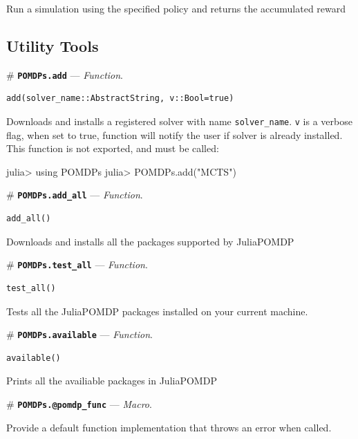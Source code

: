 \documentclass[12pt,]{article}
\newenvironment{Shaded}{}{}
\newcommand{\StringTok}[1]{\textcolor[rgb]{0.25,0.44,0.63}{{#1}}}
\newcommand{\NormalTok}[1]{{#1}}
\begin{document}
Run a simulation using the specified policy and returns the accumulated
reward

\subsection{Utility Tools}\label{utility-tools}

\# \textbf{\texttt{POMDPs.add}} --- \emph{Function}.

\begin{verbatim}
add(solver_name::AbstractString, v::Bool=true)
\end{verbatim}

Downloads and installs a registered solver with name
\texttt{solver\_name}. \texttt{v} is a verbose flag, when set to true,
function will notify the user if solver is already installed. This
function is not exported, and must be called:

\begin{Shaded}
\begin{Highlighting}[]
\NormalTok{julia> using POMDPs}
\NormalTok{julia> POMDPs.add(}\StringTok{"MCTS"}\NormalTok{)}
\end{Highlighting}
\end{Shaded}

\# \textbf{\texttt{POMDPs.add\_all}} --- \emph{Function}.

\begin{verbatim}
add_all()
\end{verbatim}

Downloads and installs all the packages supported by JuliaPOMDP

\# \textbf{\texttt{POMDPs.test\_all}} --- \emph{Function}.

\begin{verbatim}
test_all()
\end{verbatim}

Tests all the JuliaPOMDP packages installed on your current machine.

\# \textbf{\texttt{POMDPs.available}} --- \emph{Function}.

\begin{verbatim}
available()
\end{verbatim}

Prints all the availiable packages in JuliaPOMDP

\# \textbf{\texttt{POMDPs.@pomdp\_func}} --- \emph{Macro}.

Provide a default function implementation that throws an error when
called.
\end{document}

